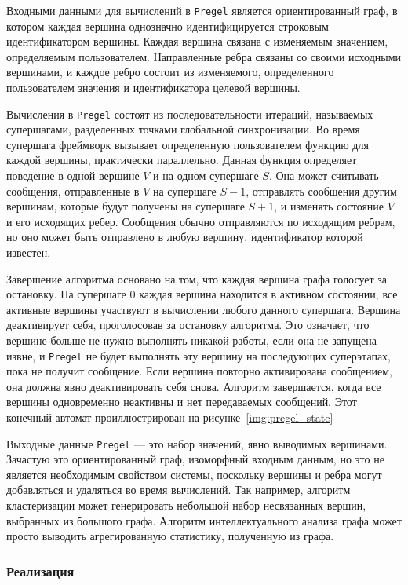Входными данными для вычислений в \texttt{Pregel} является ориентированный граф, в котором каждая вершина однозначно идентифицируется строковым идентификатором вершины. 
Каждая вершина связана с изменяемым значением, определяемым пользователем. 
Направленные ребра связаны со своими исходными вершинами, и каждое ребро состоит из изменяемого, определенного пользователем значения и идентификатора целевой вершины.

Вычисления в \texttt{Pregel} состоят из последовательности итераций, называемых супершагами, разделенных точками глобальной синхронизации.
Во время супершага фреймворк вызывает определенную пользователем функцию для каждой вершины, практически параллельно. 
Данная функция определяет поведение в одной вершине $V$ и на одном супершаге $S$. 
Она может считывать сообщения, отправленные в $V$ на супершаге $S − 1$, отправлять сообщения другим вершинам, которые будут получены на супершаге $S + 1$, и изменять состояние $V$ и его исходящих ребер. 
Сообщения обычно отправляются по исходящим ребрам, но оно может быть отправлено в любую вершину, идентификатор которой известен.

Завершение алгоритма основано на том, что каждая вершина графа голосует за остановку. 
На супершаге 0 каждая вершина находится в активном состоянии; все активные вершины участвуют в вычислении любого данного супершага. 
Вершина деактивирует себя, проголосовав за остановку алгоритма. 
Это означает, что вершине больше не нужно выполнять никакой работы, если она не запущена извне, и \texttt{Pregel} не будет выполнять эту вершину на последующих суперэтапах, пока не получит сообщение. 
Если вершина повторно активирована сообщением, она должна явно деактивировать себя снова. 
Алгоритм завершается, когда все вершины одновременно неактивны и нет передаваемых сообщений. 
Этот конечный автомат проиллюстрирован на рисунке~\ref{img:pregel_state}


Выходные данные \texttt{Pregel} --- это набор значений, явно выводимых вершинами. 
Зачастую это ориентированный граф, изоморфный входным данным, но это не является необходимым свойством системы, поскольку вершины и ребра могут добавляться и удаляться во время вычислений. 
Так например, алгоритм кластеризации может генерировать небольшой набор несвязанных вершин, выбранных из большого графа. 
Алгоритм интеллектуального анализа графа может просто выводить агрегированную статистику, полученную из графа.

\subsubsection{Реализация}

